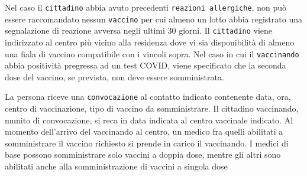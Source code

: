 \documentclass[11pt]{article}
\begin{document}
Nel caso il \texttt{cittadino} abbia avuto precedenti \texttt{reazioni allergiche}, non può essere raccomandato nessun \texttt{vaccino} per cui almeno un lotto abbia registrato una segnalazione di reazione avversa negli ultimi 30 giorni.
Il \texttt{cittadino} viene indirizzato al centro più vicino alla residenza dove vi sia disponibilità di almeno una fiala di vaccino compatibile con i vincoli sopra.
Nel caso in cui il \texttt{vaccinando} abbia positività pregressa ad un test COVID, viene specificato che la seconda dose del vaccino, se prevista, non deve essere somministrata.

La persona riceve una \texttt{convocazione} al contatto indicato contenente data, ora, centro di vaccinazione, tipo di vaccino da somministrare.
Il cittadino vaccinando, munito di convocazione, si reca in data indicata al centro vaccinale indicato.
Al momento dell’arrivo del vaccinando al centro, un medico fra quelli abilitati a somministrare il vaccino richiesto si prende in carico il vaccinando.
I medici di base possono somministrare solo vaccini a doppia dose, mentre gli altri sono abilitati anche alla somministrazione di vaccini a singola dose
\end{document}
